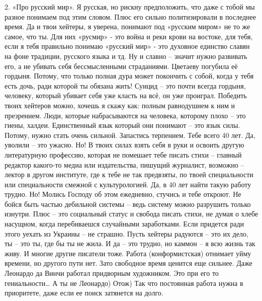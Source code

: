 \begin{itemize}
2. «Про русский мир». Я русская, но рискну предположить, что даже с тобой мы
разное понимаем под этим словом. Плюс его сильно политизировали в последнее
время. Да и твои хейтеры, я уверена, понимают под «русским миром» не то же
самое, что ты. Для них «русмир» - это война и реки крови на востоке, для тебя,
если я тебя правильно понимаю «русский мир» - это духовное единство славян на
фоне традиции, русского языка и тд. Ну и славно – значит нужно развивать его, а
не убивать себя бессмысленными страданиями. Цветаеву погубила её гордыня.
Потому, что только полная дура может покончить с собой, когда у тебя есть дочь,
ради которой ты обязана жить! Суицид – это почти всегда гордыня, человеку,
который убивает себя уже класть на всё, он уже проиграл. Победить твоих
хейтеров можно, хочешь я скажу как: полным равнодушием к ним и презрением.
Люди, которые набрасываются на человека, которому плохо – это гиены, халдеи.
Единственный язык который они понимают – это язык силы. Потому, нужно стать
очень сильной. Запастись терпением. Тебе всего 40 лет. Да, уволили – это
ужасно. Но! В твоих силах взять себя в руки и освоить другую литературную
профессию, которая не помешает тебе писать стихи – главный редактор какого-то
медиа или издательства, пишущий журналист, возможно – лектор в другом
институте, где к тебе не так предвзяты, по твоей специальности или
специальности смежной с культурологией. Да, в 40 лет найти такую работу трудно.
Но! Молись Господу об этом ежедневно, стучись и тебе откроют. Не бойся быть
частью дебильной системы – ведь систему можно разрушить только изнутри. Плюс –
это социальный статус и свобода писать стихи, не думая о хлебе насущном, когда
перебиваешся случайными заработками. Если придется ради этого уехать из Украины
– не страшно. Пусть хейтеры радуются – это их дело, ты – это ты, где бы ты не
жила. И да – это трудно, но каммон – я всю жизнь так живу. И многие другие
писатели тоже. Работа (конформистская) отнимает уйму времени, но другого пути
нет. Зато свободное время ценится еще сильнее. Даже Леонардо да Винчи работал
придворным художником. Это при его то гениальности… А ты не Леонардо) Отож) Так
что постоянная работа нужна в приоритете, даже если ее поиск затянется на
долго.




\end{itemize}
